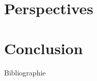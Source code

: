 \documentclass[hyperref={pdfpagelabels=false}]{beamer}
\begin{document}
    \section{Perspectives}
    \begin{frame}
        
    \end{frame}

    \section{Conclusion}
    \begin{frame}
        
    \end{frame}

    \begin{frame}{Bibliographie}
        
        
    \end{frame}
\end{document}
